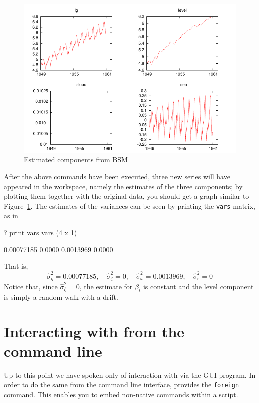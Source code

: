 \begin{figure}[htbp]
  \centering
  \includegraphics{figures/BSM-output}
  \caption{Estimated components from BSM}
  \label{fig:BSM-output}
\end{figure}

After the above commands have been executed, three new series will
have appeared in the  workspace, namely the estimates of
the three components; by plotting them together with the original
data, you should get a graph similar to
Figure~\ref{fig:BSM-output}. The estimates of the variances can be
seen by printing the \texttt{vars} matrix, as in

\begin{code}
? print vars
vars (4 x 1)

  0.00077185 
      0.0000 
   0.0013969 
      0.0000 
\end{code}

That is,
\begin{equation*}
  \hat{\sigma}^2_{\eta} = 0.00077185, \quad
  \hat{\sigma}^2_{\zeta} = 0, \quad
  \hat{\sigma}^2_{\omega} = 0.0013969, \quad
  \hat{\sigma}^2_{\varepsilon} = 0
\end{equation*}
Notice that, since $\hat{\sigma}^2_{\zeta} = 0$, the estimate for
$\beta_t$ is constant and the level component is simply a random walk
with a drift.

\section{Interacting with  from the command line}
\label{sec:foreign-command}

Up to this point we have spoken only of interaction with  via
the GUI program. In order to do the same from the command line
interface,  provides the \texttt{foreign} command. This
enables you to embed non-native commands within a 
script.

